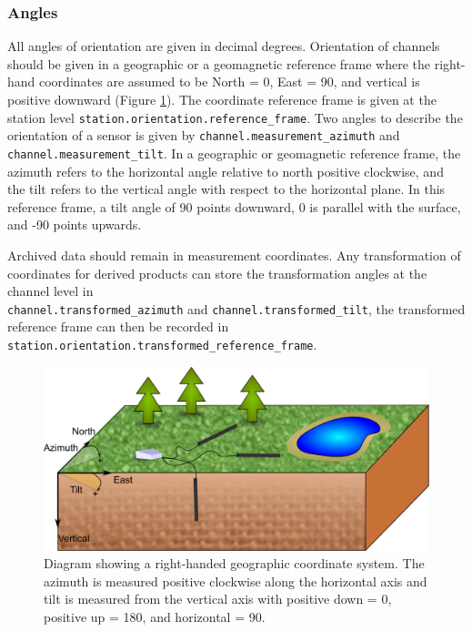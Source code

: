 \documentclass[12pt]{article}
\begin{document}
\subsubsection{Angles}

All angles of orientation are given in decimal degrees.  Orientation of channels should be given in a geographic or a geomagnetic reference frame where the right-hand coordinates are assumed to be North = 0, East = 90, and vertical is positive downward (Figure \ref{fig:reference}).  The coordinate reference frame is given at the station level \verb|station.orientation.reference_frame|.  Two angles to describe the orientation of a sensor is given by \verb|channel.measurement_azimuth| and \verb|channel.measurement_tilt|.  In a geographic or geomagnetic reference frame, the azimuth refers to the horizontal angle relative to north positive clockwise, and the tilt refers to the vertical angle with respect to the horizontal plane. In this reference frame, a tilt angle of 90 points downward, 0 is parallel with the surface, and -90 points upwards.  

Archived data should remain in measurement coordinates. Any transformation of coordinates for derived products can store the transformation angles at the channel level in \\ \verb|channel.transformed_azimuth| and \verb|channel.transformed_tilt|, the transformed reference frame can then be recorded in \verb|station.orientation.transformed_reference_frame|.      

\begin{figure}[!h]
	\centering
	\includegraphics[width=.85\textwidth]{reference_frame.pdf}
	\caption{Diagram showing a right-handed geographic coordinate system.  The azimuth is measured positive clockwise along the horizontal axis and tilt is measured from the vertical axis with positive down = 0, positive up = 180, and horizontal = 90.}
	\label{fig:reference}
\end{figure}  
\end{document}
